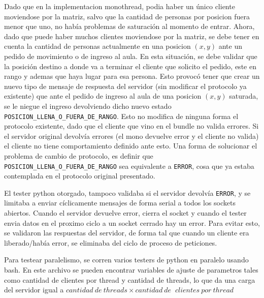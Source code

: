 Dado que en la implementacion monothread, podia haber un \'unico cliente moviendose por la matriz, salvo que la cantidad de personas por posicion fuera menor que uno, no hab\'ia problemas de saturaci\'on al momento de entrar. Ahora, dado que puede haber muchos clientes moviendose por la matriz, se debe tener en cuenta la cantidad de personas actualmente en una posicion $(x,y)$ ante un pedido de movimiento o de ingreso al aula. En esta situaci\'on, se debe validar que la posici\'on destino a donde va a terminar el cliente que solicito el pedido, este en rango y ademas que haya lugar para esa persona. Esto provoc\'o tener que crear un nuevo tipo de mensaje de respuesta del servidor (sin modificar el protocolo ya existente) que ante el pedido de ingreso al aula de una posicion $(x,y)$ saturada, se le niegue el ingreso devolviendo dicho nuevo estado \verb|POSICION_LLENA_O_FUERA_DE_RANGO|. Esto no modifica de ninguna forma el protocolo existente, dado que el cliente que vino en el bundle no valida errores. Si el servidor original devolv\'ia errores (el mono devuelve error y el cliente no valida) el cliente no tiene comportamiento definido ante esto. Una forma de solucionar el problema de cambio de protocolo, es definir que \verb|POSICION_LLENA_O_FUERA_DE_RANGO| sea equivalente a \verb|ERROR|, cosa que ya estaba contemplada en el protocolo original presentado.

El tester python otorgado, tampoco validaba si el servidor devolv\'ia \verb|ERROR|, y se limitaba a enviar c\'iclicamente mensajes de forma serial a todos los sockets abiertos. Cuando el servidor devuelve error, cierra el socket y cuando el tester envia datos en el proximo ciclo a un socket cerrado hay un error. Para evitar esto, se validaron las respuestas del servidor, de forma tal que cuando un cliente era liberado/hab\'ia error, se eliminaba del ciclo de proceso de peticiones.

Para testear paralelismo, se corren varios testers de python en paralelo usando bash. En este archivo se pueden encontrar variables de ajuste de parametros tales como cantidad de clientes por thread y cantidad de threads, lo que da una carga del servidor igual a $cantidad\ de\ threads \times cantidad\ de$ $\ clientes\ por\ thread$